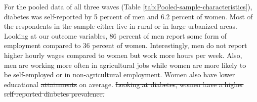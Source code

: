 \documentclass[12pt,english,british]{article}
\providecommand{\DIFaddtex}[1]{{\protect\color{blue}\uwave{#1}}} %
\providecommand{\DIFdeltex}[1]{{\protect\color{red}\sout{#1}}}                      %
\providecommand{\DIFaddbegin}{} %
\providecommand{\DIFaddend}{} %
\providecommand{\DIFdelbegin}{} %
\providecommand{\DIFdelend}{} %
\providecommand{\DIFadd}[1]{\texorpdfstring{\DIFaddtex{#1}}{#1}} %
\providecommand{\DIFdel}[1]{\texorpdfstring{\DIFdeltex{#1}}{}} %
\begin{document}
For the pooled data of all three waves (Table  \ref{tab:Pooled-sample-characteristics}),
diabetes was self-reported by 5 percent of men and 6.2 percent of
women. Most of the respondents in the sample either live in rural
or in large urbanized areas. Looking at our outcome variables, 86
percent of men report some form of employment compared to 36 percent
of women. Interestingly, men do not report higher hourly wages compared
to women but work more hours per week. Also, men are working more
often in agricultural jobs while women are more likely to be self-employed
or in non-agricultural employment. Women also have lower educational
\DIFdelbegin \DIFdel{attainments }\DIFdelend \DIFaddbegin \DIFadd{attainment }\DIFaddend on average. 
\DIFdelbegin \DIFdel{Looking at diabetes, women have a higher self-reported
diabetes prevalence. 
}\DIFdelend 
\end{document}
